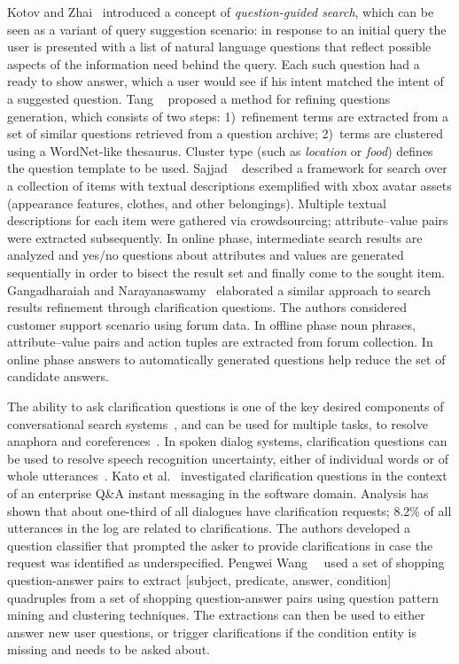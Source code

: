 Kotov and Zhai~\cite{kotov2010} introduced a concept of \textit{question-guided search}, which can be seen as a variant of query suggestion scenario: in response to an initial query the user is presented with a list of natural language questions that reflect possible aspects of the information need behind the query.
Each such question had a ready to show answer, which a user would see if his intent matched the intent of a suggested question.
Tang \etal~\cite{tang2011} proposed a method for refining questions generation, which consists of two steps: 1)~refinement terms are extracted from a set of similar questions retrieved from a question archive; 2)~terms are clustered using a WordNet-like thesaurus.
Cluster type (such as \textit{location} or \textit{food}) defines the question template to be used.
Sajjad \etal~\cite{sajjad12} described a framework for search over a collection of items with textual descriptions exemplified with xbox avatar assets (appearance features, clothes, and other belongings).
Multiple textual descriptions for each item were gathered via crowdsourcing; attribute--value pairs were extracted subsequently.
In online phase, intermediate search results are analyzed and yes/no questions about attributes and values are generated sequentially in order to bisect the result set and finally come to the sought item.
Gangadharaiah and Narayanaswamy~\cite{gangadharaiah2013} elaborated a similar approach to search results refinement through clarification questions.
The authors considered customer support scenario using forum data.
In offline phase noun phrases, attribute--value pairs and action tuples are extracted from forum collection.
In online phase answers to automatically generated questions help reduce the set of candidate answers.

The ability to ask clarification questions is one of the key desired components of conversational search systems~\cite{radlinski2017}, and can be used for multiple tasks, 
\eg to resolve anaphora and coreferences~\cite{quarteroni2009}.
In spoken dialog systems, clarification questions can be used to resolve speech recognition uncertainty, either of individual words or of whole utterances~\cite{stoyanchev2013}. 
Kato et al.~\cite{kato2013} investigated clarification questions in the context of an enterprise  Q\&A instant messaging in the software domain.
Analysis has shown that about one-third of all dialogues have clarification requests; 8.2\% of all utterances in the log are related to clarifications.
The authors developed a question classifier that prompted the asker to provide clarifications in case the request was identified as underspecified. 
Pengwei Wang~\etal~\cite{wang2016learning} used a set of shopping question-answer pairs to extract [subject, predicate, answer, condition] quadruples from a set of shopping question-answer pairs using question pattern mining and clustering techniques.
The extractions can then be used to either answer new user questions, or trigger clarifications if the condition entity is missing and needs to be asked about.

